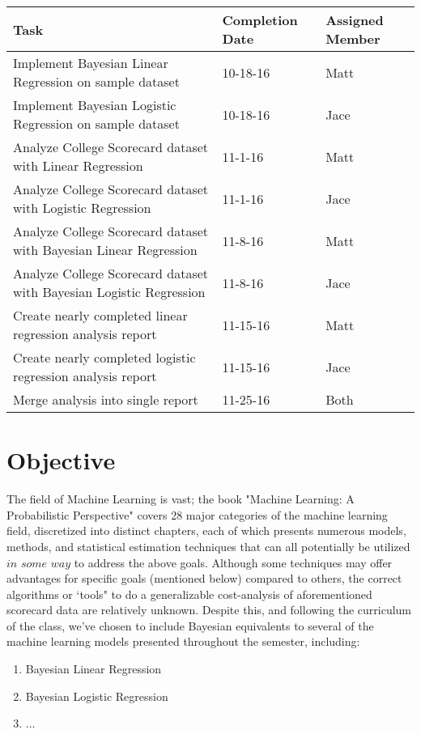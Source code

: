 \documentclass[10pt]{article}
\begin{document}
\begin{center}
\begin{tabular}{| P{7cm} | P{2cm} | P{1.5cm} |}
 \hline Task & Completion Date & Assigned Member \\ 
 \hline Implement Bayesian Linear Regression on sample dataset & 10-18-16 & Matt \\  
 \hline Implement Bayesian Logistic Regression on sample dataset & 10-18-16 & Jace \\
 \hline Analyze College Scorecard dataset with Linear Regression & 11-1-16 & Matt \\
 \hline Analyze College Scorecard dataset with Logistic Regression & 11-1-16 & Jace \\
 \hline Analyze College Scorecard dataset with Bayesian Linear Regression & 11-8-16 & Matt \\
 \hline Analyze College Scorecard dataset with Bayesian Logistic Regression & 11-8-16 & Jace \\
 \hline Create nearly completed linear regression analysis report & 11-15-16 & Matt \\
 \hline Create nearly completed logistic regression analysis report & 11-15-16 & Jace \\
 \hline Merge analysis into single report & 11-25-16 & Both \\
 \hline
\end{tabular}
\end{center}


    
\section{Objective}
The field of Machine Learning is vast; the book "Machine Learning: A Probabilistic Perspective" covers 28 major categories of the machine learning field, discretized into distinct chapters, each of which presents numerous models, methods, and statistical estimation techniques that can all potentially be utilized  $\textit{in some way}$ to address the above goals. Although some techniques may offer advantages for specific goals (mentioned below) compared to others, the correct algorithms or `tools" to do a generalizable cost-analysis of aforementioned scorecard data are relatively unknown. Despite this, and following the curriculum of the class, we've chosen to include Bayesian equivalents to several of the machine learning models presented throughout the semester, including: 
\begin{enumerate}
	\item Bayesian Linear Regression 
    \item Bayesian Logistic Regression
    \item ... 
\end{enumerate}
\end{document}
